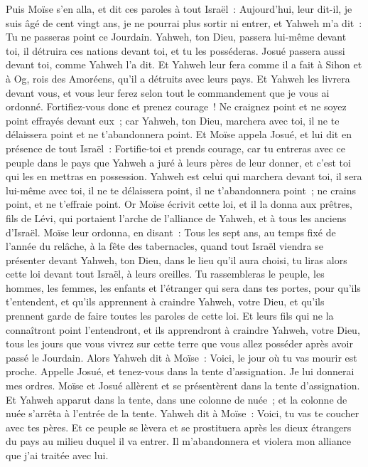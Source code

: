 \begin{multicols}{2}
\VerseOne{}Puis Moïse s'en alla, et dit ces paroles à tout Israël~:
Aujourd'hui, leur dit-il, je suis âgé de cent vingt ans, je ne pourrai plus sortir ni entrer, et Yahweh m'a dit~: Tu ne passeras point ce Jourdain.
Yahweh, ton Dieu, passera lui-même devant toi, il détruira ces nations devant toi, et tu les posséderas. Josué passera aussi devant toi, comme Yahweh l'a dit.
Et Yahweh leur fera comme il a fait à Sihon et à Og, rois des Amoréens, qu'il a détruits avec leurs pays.
Et Yahweh les livrera devant vous, et vous leur ferez selon tout le commandement que je vous ai ordonné.
Fortifiez-vous donc et prenez courage~! Ne craignez point et ne soyez point effrayés devant eux~; car Yahweh, ton Dieu, marchera avec toi, il ne te délaissera point et ne t'abandonnera point.
Et Moïse appela Josué, et lui dit en présence de tout Israël~: Fortifie-toi et prends courage, car tu entreras avec ce peuple dans le pays que Yahweh a juré à leurs pères de leur donner, et c'est toi qui les en mettras en possession.
Yahweh est celui qui marchera devant toi, il sera lui-même avec toi, il ne te délaissera point, il ne t'abandonnera point~; ne crains point, et ne t'effraie point.
Or Moïse écrivit cette loi, et il la donna aux prêtres, fils de Lévi, qui portaient l'arche de l'alliance de Yahweh, et à tous les anciens d'Israël.
Moïse leur ordonna, en disant~: Tous les sept ans, au temps fixé de l'année du relâche, à la fête des tabernacles,
quand tout Israël viendra se présenter devant Yahweh, ton Dieu, dans le lieu qu'il aura choisi, tu liras alors cette loi devant tout Israël, à leurs oreilles.
Tu rassembleras le peuple, les hommes, les femmes, les enfants et l'étranger qui sera dans tes portes, pour qu'ils t'entendent, et qu'ils apprennent à craindre Yahweh, votre Dieu, et qu'ils prennent garde de faire toutes les paroles de cette loi.
Et leurs fils qui ne la connaîtront point l'entendront, et ils apprendront à craindre Yahweh, votre Dieu, tous les jours que vous vivrez sur cette terre que vous allez posséder après avoir passé le Jourdain.
Alors Yahweh dit à Moïse~: Voici, le jour où tu vas mourir est proche. Appelle Josué, et tenez-vous dans la tente d'assignation. Je lui donnerai mes ordres. Moïse et Josué allèrent et se présentèrent dans la tente d'assignation.
Et Yahweh apparut dans la tente, dans une colonne de nuée~; et la colonne de nuée s'arrêta à l'entrée de la tente.
Yahweh dit à Moïse~: Voici, tu vas te coucher avec tes pères. Et ce peuple se lèvera et se prostituera après les dieux étrangers du pays au milieu duquel il va entrer. Il m'abandonnera et violera mon alliance que j'ai traitée avec lui.

\end{multicols}
